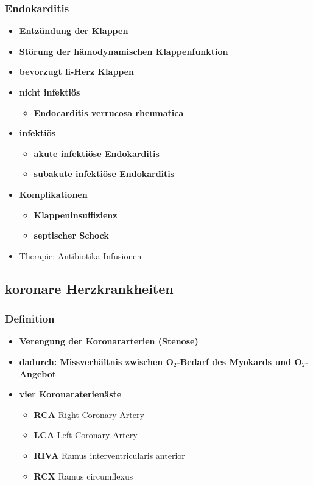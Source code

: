	\subsubsection{Endokarditis}
		\begin{itemize}
			\item \textbf{Entzündung der Klappen}
			\item \textbf{Störung der hämodynamischen Klappenfunktion}
			\item \textbf{bevorzugt li-Herz Klappen}
			\item \textbf{nicht infektiös}
				\begin{itemize}
					\item \textbf{Endocarditis verrucosa rheumatica}
				\end{itemize}
			\item \textbf{infektiös}
				\begin{itemize}
					\item \textbf{akute infektiöse Endokarditis}
					\item \textbf{subakute infektiöse Endokarditis}
				\end{itemize}
			\item \textbf{Komplikationen}
				\begin{itemize}
					\item \textbf{Klappeninsuffizienz}
					\item \textbf{septischer Schock}
				\end{itemize}
			\item Therapie: Antibiotika Infusionen
		\end{itemize}
\subsection{koronare Herzkrankheiten}
	\subsubsection{Definition}
		\begin{itemize}
			\item \textbf{Verengung der Koronararterien (Stenose)}
			\item \textbf{dadurch: Missverhältnis zwischen O$_2$-Bedarf des Myokards und O$_2$-Angebot}
			\item \textbf{vier Koronaraterienäste}
				\begin{itemize}
					\item \textbf{RCA} Right Coronary Artery
					\item \textbf{LCA} Left Coronary Artery
					\item \textbf{RIVA} Ramus interventricularis anterior 
					\item \textbf{RCX} Ramus circumflexus
				\end{itemize}
		\end{itemize}
